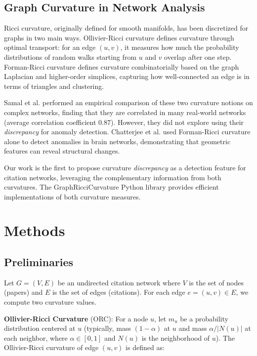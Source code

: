 \documentclass[11pt,letterpaper]{article}
\begin{document}
\subsection{Graph Curvature in Network Analysis}

Ricci curvature, originally defined for smooth manifolds, has been discretized for graphs in two main ways. Ollivier-Ricci curvature \cite{Ollivier2009} defines curvature through optimal transport: for an edge $(u,v)$, it measures how much the probability distributions of random walks starting from $u$ and $v$ overlap after one step. Forman-Ricci curvature \cite{Forman2003} defines curvature combinatorially based on the graph Laplacian and higher-order simplices, capturing how well-connected an edge is in terms of triangles and clustering.

Samal et al. \cite{Samal2018} performed an empirical comparison of these two curvature notions on complex networks, finding that they are correlated in many real-world networks (average correlation coefficient 0.87). However, they did not explore using their \textit{discrepancy} for anomaly detection. Chatterjee et al. \cite{Chatterjee2021} used Forman-Ricci curvature alone to detect anomalies in brain networks, demonstrating that geometric features can reveal structural changes.

Our work is the first to propose curvature \textit{discrepancy} as a detection feature for citation networks, leveraging the complementary information from both curvatures. The GraphRicciCurvature Python library \cite{GraphRicciCurvature2024} provides efficient implementations of both curvature measures.

\section{Methods}

\subsection{Preliminaries}

Let $G = (V, E)$ be an undirected citation network where $V$ is the set of nodes (papers) and $E$ is the set of edges (citations). For each edge $e = (u,v) \in E$, we compute two curvature values.

\textbf{Ollivier-Ricci Curvature} (ORC): For a node $u$, let $m_u$ be a probability distribution centered at $u$ (typically, mass $(1-\alpha)$ at $u$ and mass $\alpha/|N(u)|$ at each neighbor, where $\alpha \in [0,1]$ and $N(u)$ is the neighborhood of $u$). The Ollivier-Ricci curvature of edge $(u,v)$ is defined as:
\end{document}
